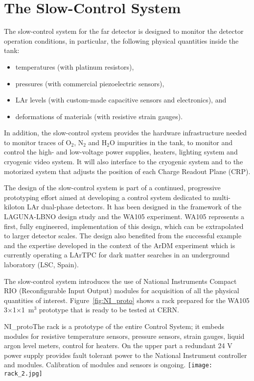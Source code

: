 \section{The Slow-Control System} 
\label{sec:detectors-fd-alt-dcs}

The slow-control system for the far detector is designed  to
monitor the detector operation conditions, in particular, the following physical
quantities inside the tank:
\begin{itemize}
 \item temperatures (with platinum resistors),
 \item pressures (with commercial piezoelectric sensors),
 \item LAr levels (with custom-made capacitive sensors and electronics), and
 \item deformations of materials (with resistive strain gauges).
\end{itemize} 

In addition, the slow-control system provides the hardware
infrastructure needed to monitor traces of O$_2$, N$_2$ and H$_2$O
impurities in the tank, to monitor and control the high- and
low-voltage power supplies, heaters, lighting system and cryogenic
video system. It will also interface to the cryogenic system and to
the motorized system that adjusts the position of each Charge Readout
Plane (CRP).


The design of the slow-control system is part of a
continued, progressive prototyping effort aimed at developing a
control system dedicated to multi-kiloton LAr dual-phase detectors. It
has been designed in the framework of the LAGUNA-LBNO design study and
 the WA105 experiment. WA105 represents a first, fully engineered,
implementation of this design, which can be extrapolated to larger
detector scales. The design also benefited from the successful example
and the expertise developed in the context of the ArDM
experiment\cite{Badertscher:2013ygt} which is currently operating a
LArTPC for dark matter searches in an underground laboratory (LSC,
Spain).

The slow-control system introduces the use of National Instruments
Compact RIO (Reconfigurable Input Output) modules for acquisition of
all the physical quantities of interest.  Figure~\ref{fig:NI_proto}
shows a rack prepared for the WA105 3$\times$1$\times$1~m$^3$
prototype that is ready to be tested at CERN.
\begin{cdrfigure}{NI_proto}{The rack is a  prototype of the entire Control System; it  embeds modules for resistive 
temperature sensors, pressure  sensors, strain gauges, liquid argon level  meters, control for  heaters. On the upper part a redundant 24 V power supply 
provides fault tolerant power to the National Instrument controller and modules.  Calibration of modules and sensors is ongoing.}
\texttt{[image: rack\_2.jpg]}
\end{cdrfigure}


